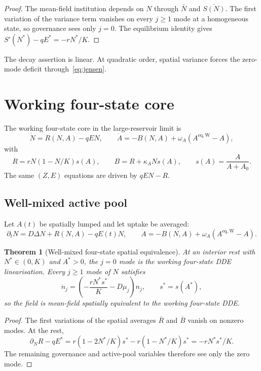 \documentclass[11pt]{article}
\newtheorem{theorem}{Theorem}
\theoremstyle{definition}
\begin{document}
\begin{proof}
The mean-field institution depends on $N$ through $\bar N$ and $\overline{S(N)}$. The first variation of the variance term vanishes on every $j\ge1$ mode at a homogeneous state, so governance sees only $j=0$. The equilibrium identity gives $S'(N^*)-qE^*=-rN^*/K$.\end{proof}

The decay assertion is linear. At quadratic order, spatial variance forces the zero-mode deficit through~\eqref{eq:jensen}.

\section{Working four-state core}
\label{sec:four}

The working four-state core in the large-reservoir limit is
\begin{equation}
\dot N=R(N,A)-qEN,
\qquad
\dot A=-B(N,A)+\omega_A(A^{\mathrm{eq,W}}-A),
\label{eq:four-ode}
\end{equation}
with
\[
R=rN(1-N/K)s(A),
\qquad
B=R+\kappa_A Ns(A),
\qquad
s(A)=\frac{A}{A+A_0}.
\]
The same $(Z,E)$ equations are driven by $qEN-R$.

\subsection{Well-mixed active pool}

Let $A(t)$ be spatially lumped and let uptake be averaged:
\begin{equation}
\partial_tN=D\Delta N+R(N,A)-qE(t)N,
\qquad
\dot A=-\overline{B(N,A)}+\omega_A(A^{\mathrm{eq,W}}-A).
\label{eq:mf4}
\end{equation}

\begin{theorem}[Well-mixed four-state spatial equivalence]
\label{thm:mf4}
At an interior rest with $N^*\in(0,K)$ and $A^*>0$, the $j=0$ mode is the working four-state DDE linearisation. Every $j\ge1$ mode of $N$ satisfies
\begin{equation}
\dot n_j=\left(-\frac{rN^*s^*}{K}-D\mu_j\right)n_j,
\qquad s^*=s(A^*),
\label{eq:n4}
\end{equation}
so the field is mean-field spatially equivalent to the working four-state DDE.
\end{theorem}

\begin{proof}
The first variations of the spatial averages $\overline R$ and $\overline B$ vanish on nonzero modes. At the rest,
\[
\partial_NR-qE^*=r(1-2N^*/K)s^*-r(1-N^*/K)s^*=-rN^*s^*/K.
\]
The remaining governance and active-pool variables therefore see only the zero mode.\end{proof}
\end{document}
